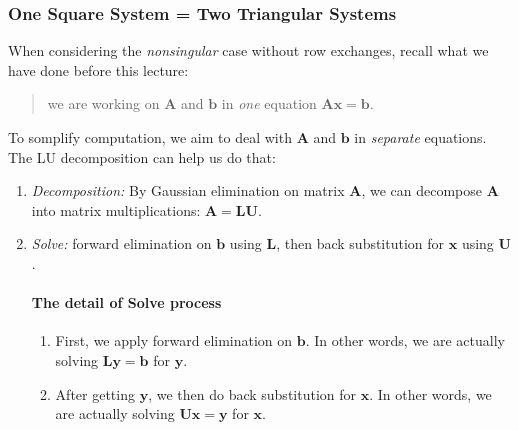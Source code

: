 \subsubsection{One Square System = Two Triangular Systems}
When considering the \textit{nonsingular} case without row exchanges, recall what we have done before this lecture: 
\begin{quotation}
we are working on $\bm A$ and $\bm b$ in \emph{one} equation $\bm{Ax}=\bm b$. 
\end{quotation}
To somplify computation, we aim to deal with $\bm A$ and $\bm b$ in \emph{separate} equations. The LU decomposition can help us do that:
\begin{enumerate}
\item
\emph{Decomposition:} By Gaussian elimination on matrix $\bm A$, we can decompose $\bm A$ into matrix multiplications: $\bm A=\bm{LU}.$
\item
\emph{Solve:} forward elimination on $\bm b$ using $\bm L$, then back substitution for $\bm x$ using $\bm U$.
\begin{remark}
\paragraph{The detail of Solve process}
\begin{enumerate}
\item
First, we apply forward elimination on $\bm b$. In other words, we are actually solving $\bm{Ly}=\bm b$ for $\bm y$. 
\item
After getting $\bm y$, we then do
back substitution for $\bm x$. In other words, we are actually solving $\bm{Ux}=\bm y$ for $\bm x$. 
\end{enumerate}

\end{remark}
\end{enumerate}
